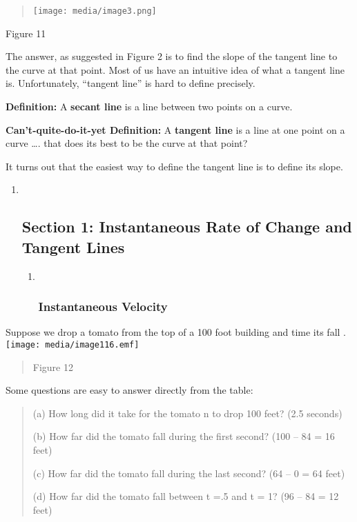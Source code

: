 \begin{quote}
\texttt{[image: media/image3.png]}
\end{quote}

Figure 11

The answer, as suggested in Figure 2 is to find the slope of the tangent
line to the curve at that point. Most of us have an intuitive idea of
what a tangent line is. Unfortunately, ``tangent line'' is hard to
define precisely.

\textbf{Definition:} A \textbf{secant line} is a line between two points
on a curve.

\textbf{Can't-quite-do-it-yet Definition:} A \textbf{tangent line} is a
line at one point on a curve \ldots{}. that does its best to be the
curve at that point?

It turns out that the easiest way to define the tangent line is to
define its slope.

\begin{enumerate}
\item ~
  \hypertarget{section-1-instantaneous-rate-of-change-and-tangent-lines}{\subsection{Section
  1: Instantaneous Rate of Change and Tangent
  Lines}\label{section-1-instantaneous-rate-of-change-and-tangent-lines}}

  \begin{enumerate}
  \item ~
    \subsubsection{Instantaneous Velocity}\label{instantaneous-velocity}
  \end{enumerate}
\end{enumerate}

Suppose we drop a tomato from the top of a 100 foot building and time
its fall .
\texttt{[image: media/image116.emf]}

\begin{quote}
Figure 12
\end{quote}

Some questions are easy to answer directly from the table:

\begin{quote}
(a) How long did it take for the tomato n to drop 100 feet? (2.5
seconds)

(b) How far did the tomato fall during the first second? (100 -- 84 = 16
feet)

(c) How far did the tomato fall during the last second? (64 -- 0 = 64
feet)

(d) How far did the tomato fall between t =.5 and t = 1? (96 -- 84 = 12
feet)
\end{quote}

